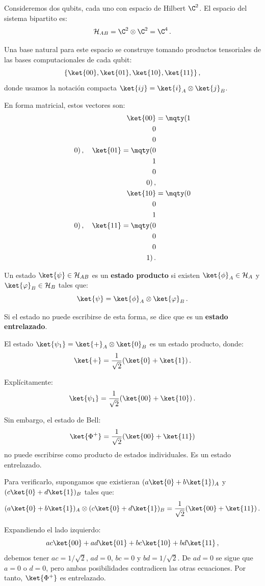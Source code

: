 \begin{eje}
  Consideremos dos qubits, cada uno con espacio de Hilbert $\C^2$. El espacio del sistema bipartito es:
  \[
    \mathcal{H}_{AB} = \C^2 \otimes \C^2 = \C^4\,.
  \]

  Una base natural para este espacio se construye tomando productos tensoriales de las bases computacionales de cada qubit:
  \[
    \{\ket{00}, \ket{01}, \ket{10}, \ket{11}\}\,,
  \]
  donde usamos la notación compacta $\ket{ij} = \ket{i}_A \otimes \ket{j}_B$.

  En forma matricial, estos vectores son:
  \begin{align*}
    \ket{00} & = \mqty(1 \\ 0 \\ 0 \\ 0)\,, \quad
    \ket{01} = \mqty(0   \\ 1 \\ 0 \\ 0)\,, \\
    \ket{10} & = \mqty(0 \\ 0 \\ 1 \\ 0)\,, \quad
    \ket{11} = \mqty(0   \\ 0 \\ 0 \\ 1)\,.
  \end{align*}
\end{eje}

\begin{defi}
  Un estado $\ket{\psi} \in \mathcal{H}_{AB}$ es un \textbf{estado producto} si existen $\ket{\phi}_A \in \mathcal{H}_A$ y $\ket{\varphi}_B \in \mathcal{H}_B$ tales que:
  \[
    \ket{\psi} = \ket{\phi}_A \otimes \ket{\varphi}_B\,.
  \]

  Si el estado no puede escribirse de esta forma, se dice que es un \textbf{estado entrelazado}.
\end{defi}

\begin{eje}
  El estado $\ket{\psi_1} = \ket{+}_A \otimes \ket{0}_B$ es un estado producto, donde:
  \[
    \ket{+} = \frac{1}{\sqrt{2}}(\ket{0} + \ket{1})\,.
  \]

  Explícitamente:
  \[
    \ket{\psi_1} = \frac{1}{\sqrt{2}}(\ket{00} + \ket{10})\,.
  \]

  Sin embargo, el estado de Bell:
  \[
    \ket{\Phi^+} = \frac{1}{\sqrt{2}}(\ket{00} + \ket{11})
  \]
  no puede escribirse como producto de estados individuales. Es un estado entrelazado.

  Para verificarlo, supongamos que existieran $(a\ket{0} + b\ket{1})_A$ y $(c\ket{0} + d\ket{1})_B$ tales que:
  \[
    (a\ket{0} + b\ket{1})_A \otimes (c\ket{0} + d\ket{1})_B = \frac{1}{\sqrt{2}}(\ket{00} + \ket{11})\,.
  \]

  Expandiendo el lado izquierdo:
  \[
    ac\ket{00} + ad\ket{01} + bc\ket{10} + bd\ket{11}\,,
  \]
  debemos tener $ac = 1/\sqrt{2}$, $ad = 0$, $bc = 0$ y $bd = 1/\sqrt{2}$. De $ad = 0$ se sigue que $a = 0$ o $d = 0$, pero ambas posibilidades contradicen las otras ecuaciones. Por tanto, $\ket{\Phi^+}$ es entrelazado.
\end{eje}

